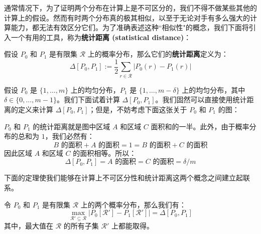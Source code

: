 通常情况下，为了证明两个分布在计算上是不可区分的，我们不得不做某些其他的计算上的假设。然而有时两个分布真的极其相似，以至于无论对手有多么强大的计算能力，都无法有效区分它们。为了准确表述这种``相似性"的概念，我们下面将引入一个有用的工具，称为\textbf{统计距离 (statistical distance)}：

\begin{definition}[统计距离]\label{def:3-5}
假设 $P_0$ 和 $P_1$ 是有限集 $\mathcal R$ 上的概率分布，那么它们的\textbf{统计距离}定义为：
\[
\Delta[P_0,P_1]:=\frac{1}{2}\sum_{r\in\mathcal{R}}\big\lvert P_0(r)-P_1(r)\big\rvert
\]
\end{definition}

\begin{example}\label{exmp:3-1}
假设 $P_0$ 是 $\{1,\dots,m\}$ 上的均匀分布，$P_1$ 是 $\{1,\dots,m-\delta\}$ 上的均匀分布，其中 $\delta\in\{0,\dots,m-1\}$。我们下面试着计算 $\Delta[P_0,P_1]$。我们固然可以直接使用统计距离的定义来计算 $\Delta[P_0,P_1]$；但是，不妨考虑下面这张关于 $P_0$ 和 $P_1$ 的图：

\begin{figure*}[h!]
  \centering
  
\end{figure*}

$P_0$ 和 $P_1$ 的统计距离就是图中区域 $A$ 和区域 $C$ 面积和的一半。此外，由于概率分布的总和为 $1$，我们必然有：
\[
B \text{ 的面积} + A \text{ 的面积} = 1 = B \text{ 的面积} + C \text{ 的面积}
\]
因此区域 $A$ 和区域 $C$ 的面积相等。所以：
\[
\Delta[P_0,P_1]= A \text{ 的面积} = C \text{ 的面积} ={\delta}/{m}
\]
\end{example}

下面的定理使我们能够在计算上不可区分性和统计距离这两个概念之间建立起联系。

\begin{theorem}\label{theo:3-10}
令 $P_0$ 和 $P_1$ 是有限集 $\mathcal R$ 上的两个概率分布，那么我们有：
\[
\max_{\mathcal{R}'\subseteq\mathcal{R}}
\big\lvert
P_0[\mathcal{R}']-P_1[\mathcal{R}']
\big\rvert
=\Delta[P_0,P_1]
\]
其中，最大值在 $\mathcal R$ 的所有子集 $\mathcal R'$ 上都能取得。
\end{theorem}

